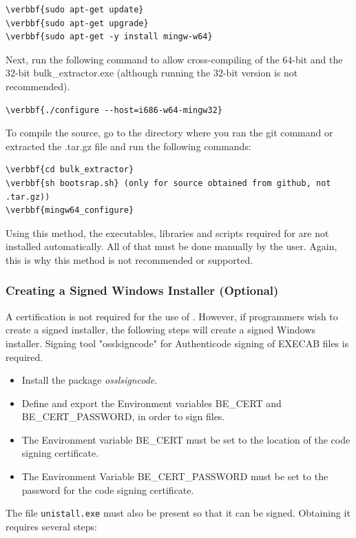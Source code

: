 \documentclass[11pt,fleqn]{article} %
\begin{document}
\begin{Verbatim}[commandchars=\\\{\}] 
\verbbf{sudo apt-get update}
\verbbf{sudo apt-get upgrade}
\verbbf{sudo apt-get -y install mingw-w64}
\end{Verbatim}
Next, run the following command to allow cross-compiling of the 64-bit and the 32-bit bulk\_extractor.exe (although running the 32-bit version is not recommended).
\begin{Verbatim}[commandchars=\\\{\}] 
\verbbf{./configure --host=i686-w64-mingw32}
\end{Verbatim}


To compile the source, go to the \bulk directory where you ran the git command or extracted the .tar.gz file and run the following commands:
\begin{Verbatim}[commandchars=\\\{\}] 
\verbbf{cd bulk_extractor}
\verbbf{sh bootsrap.sh} (only for source obtained from github, not .tar.gz))
\verbbf{mingw64_configure}
\end{Verbatim}

Using this method, the executables, libraries and scripts required for \bulk are not installed automatically. All of that must be done manually by the user. Again, this is why this method is not recommended or supported.

\subsubsection{Creating a Signed Windows Installer (Optional)}
A certification is not required for the use of \bulk. However, if programmers wish to create a signed installer, the following steps will create a signed Windows installer. Signing tool "osslsigncode" for Authenticode signing of EXE\/CAB files is required. 
\begin{itemize}
\item Install the package \textit{osslsigncode}. 
\item Define and export the Environment variables BE\_CERT and \\
BE\_CERT\_PASSWORD, in order to sign files. 
\item The Environment variable BE\_CERT must be set to the location of the code signing certificate. 
\item The Environment Variable BE\_CERT\_PASSWORD must be set to the password for the code signing certificate.
\end{itemize}
The file \texttt{unistall.exe} must also be present so that it can be signed. Obtaining it requires several steps:
\end{document}
